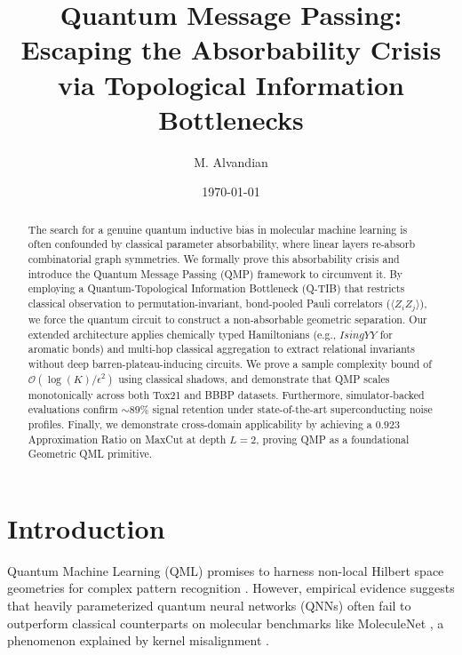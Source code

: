 \documentclass[aps,prxquantum,twocolumn,superscriptaddress]{revtex4-2}
\begin{document}
\title{Quantum Message Passing: Escaping the Absorbability Crisis via Topological Information Bottlenecks}

\author{M. Alvandian}

\date{\today}

\begin{abstract}
The search for a genuine quantum inductive bias in molecular machine learning is often confounded by classical parameter absorbability, where linear layers re-absorb combinatorial graph symmetries. We formally prove this absorbability crisis and introduce the Quantum Message Passing (QMP) framework to circumvent it. By employing a Quantum-Topological Information Bottleneck (Q-TIB) that restricts classical observation to permutation-invariant, bond-pooled Pauli correlators ($\langle Z_i Z_j \rangle$), we force the quantum circuit to construct a non-absorbable geometric separation. Our extended architecture applies chemically typed Hamiltonians (e.g., $IsingYY$ for aromatic bonds) and multi-hop classical aggregation to extract relational invariants without deep barren-plateau-inducing circuits. We prove a sample complexity bound of $\mathcal{O}(\log(K)/\epsilon^2)$ using classical shadows, and demonstrate that QMP scales monotonically across both Tox21 and BBBP datasets. Furthermore, simulator-backed evaluations confirm $\sim 89\%$ signal retention under state-of-the-art superconducting noise profiles. Finally, we demonstrate cross-domain applicability by achieving a $0.923$ Approximation Ratio on MaxCut at depth $L=2$, proving QMP as a foundational Geometric QML primitive.
\end{abstract}

\maketitle

\section{Introduction}
Quantum Machine Learning (QML) promises to harness non-local Hilbert space geometries for complex pattern recognition \cite{wiersema2025}. However, empirical evidence suggests that heavily parameterized quantum neural networks (QNNs) often fail to outperform classical counterparts on molecular benchmarks like MoleculeNet \cite{wu2018}, a phenomenon explained by kernel misalignment \cite{schuld2021, kubler2021}.
\end{document}
